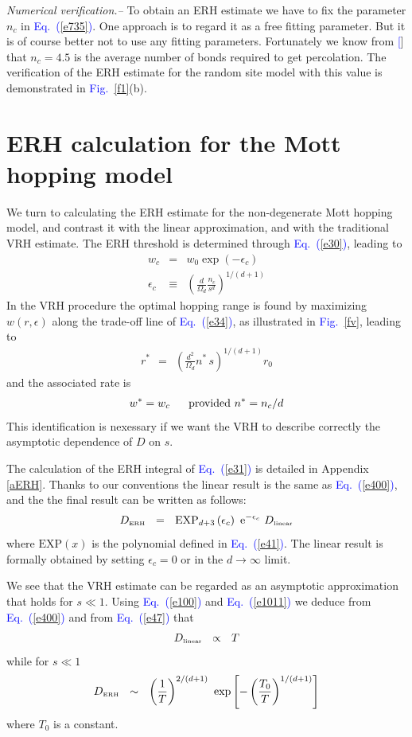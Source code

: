 \documentclass[aps,pre,floats,floatfix,twocolumn]{revtex4}
\newcommand{\eexp}{\mbox{e}^}
\newcommand{\tbox}[1]{\mbox{\tiny #1}}
\newcommand{\mylabel}[1]{\label{#1}}
\newcommand{\beq}{\begin{eqnarray}}
\newcommand{\eeq}{\end{eqnarray}}
\newcommand{\be}[1]{\begin{eqnarray}\ifthenelse{#1=-1}
{\nonumber}{\ifthenelse{#1=0}{}{\mylabel{e#1}}}}
\newcommand{\Eq}[1]{\textcolor{blue}{Eq.\!\!~(\ref{#1})}}
\newcommand{\Fig}[1]{\textcolor{blue}{Fig.}\!\!~\ref{#1}}
\newcommand{\rmrk}[1]{#1}
\renewcommand{\cite}[1]{\textcolor{blue}{[\onlinecite{#1}}]} %
\begin{document}
{\em Numerical verification.-- } 
%
To obtain an ERH estimate we have to fix  
the parameter $n_c$ in \Eq{e735}. 
One approach is to regard it as a free fitting parameter.
\rmrk{But it is of course better not to use any fitting parameters.}
Fortunately we know from \cite{Dalton,Pike} 
that $n_c=4.5$ is the average number of bonds 
required to get percolation. 
The verification of the ERH estimate for 
the random site model with this value is 
demonstrated in \Fig{f1}(b).


\section{ERH calculation for the Mott hopping model}
\label{sM}

We turn to calculating the ERH estimate for the non-degenerate Mott hopping model, 
and contrast it with the linear approximation, and with the traditional VRH estimate.
The ERH threshold is determined \rmrk{through} \Eq{e30}, leading to   
%
\beq
w_c &=& w_0\exp(-\epsilon_c) \\ 
\epsilon_c &\equiv& \left( \frac{d}{\Omega_d} \frac{n_c}{s^d} \right)^{1/(d+1)}
\eeq 
%
In the VRH procedure the optimal hopping range 
is found by maximizing $w(r,\epsilon)$ 
along the trade-off line of \Eq{e34}, 
as illustrated in \Fig{fv}, leading to 
%
\beq
r^* \ \ = \ \ \left(\frac{d^2}{\Omega_d} n^* \, s \right)^{1/(d+1)} r_0
\eeq 
%
and the associated rate is 
%
\be{46}
w^* = w_c \ \ \ \ \ \text{provided} \ n^*=n_c/d
\eeq 
%
This identification is nexessary if we want the VRH to 
describe correctly the asymptotic dependence of $D$ on $s$.


\rmrk{The calculation of the ERH integral of \Eq{e31} 
is detailed} in Appendix \ref{aERH}. 
Thanks to our conventions the linear result is the same as \Eq{e400},  
and the the final result can be written as follows:  
%
\be{47}
D_{\tbox{ERH}} \ \ = \ \  
\mathrm{EXP}_{d{+}3}\left(\epsilon_c\right)  \  \eexp{-\epsilon_c}  \ D_{\tbox{linear}}
\eeq 
%
where $\mathrm{EXP}(x)$ is the polynomial 
defined in \Eq{e41}. 
The linear result is formally obtained by setting ${\epsilon_c=0}$
or in the $d\rightarrow\infty$ limit. 

We see that the VRH estimate can be regarded as an 
asymptotic approximation that holds for ${s\ll1}$. 
Using \Eq{e100} and \Eq{e1011} we deduce 
from  \Eq{e400} and from \Eq{e47} that 
%
\beq
D_{\tbox{linear}} \ \ \propto \ \ T
\eeq
%
while for ${s\ll1}$
%
\beq
D_{\tbox{ERH}} \ \ \sim \ \ \left(\frac{1}{T}\right)^{2/(d+1)} 
\  \exp\left[-\left(\frac{T_0}{T}\right)^{1/(d+1)}\right]
\eeq
%
where $T_0$ is a constant. 
\end{document}
